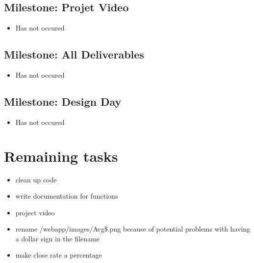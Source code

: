 \documentclass[11pt,a4paper,oneside]{article}
\begin{document}
\subsection{Milestone: Projet Video}
\begin{itemize}
\item Has not occured
\end{itemize}

\subsection{Milestone: All Deliverables}
\begin{itemize}
\item Has not occured
\end{itemize}

\subsection{Milestone: Design Day}
\begin{itemize}
\item Has not occured
\end{itemize}




\section{Remaining tasks}
\begin{itemize}
\item clean up code
\item write documentation for functions
\item project video
\item rename /webapp/images/Avg\$.png because of potential problems with having a dollar sign in the filename
\item make close rate a percentage
\end{itemize}
\end{document}
